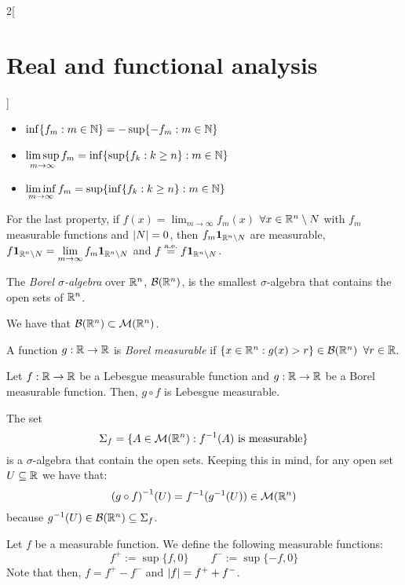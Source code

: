 \documentclass[../../../main_math.tex]{subfiles}
\begin{document}
\begin{multicols}{2}[\section{Real and functional analysis}]
\begin{sproof}
\begin{itemize}
      \item $\displaystyle\inf\{f_m:m\in\mathbb{N}\}=-\sup\{-f_m:m\in\mathbb{N}\}$
      \item $\displaystyle\limsup_{m\to\infty} f_m=\inf\{\sup\{f_k:k\geq n\}:m\in\mathbb{N}\}$
      \item $\displaystyle\liminf_{m\to\infty} f_m =\sup\{\inf\{f_k:k\geq n\}:m\in\mathbb{N}\}$
    \end{itemize}
    For the last property, if $\displaystyle f(x)=\lim_{m\to\infty} f_m(x)$ $\forall x\in\mathbb{R}^n\setminus N$ with $f_m$ measurable functions and $\m{N}=0$, then $f_m\boldsymbol{\mathrm{1}}_{\mathbb{R}^n\setminus N}$ are measurable, $\displaystyle f\boldsymbol{\mathrm{1}}_{\mathbb{R}^n\setminus N}=\lim_{m\to\infty} f_m\boldsymbol{\mathrm{1}}_{\mathbb{R}^n\setminus N}$ and $f\overset{\text{a.e.}}{=}f\boldsymbol{\mathrm{1}}_{\mathbb{R}^n\setminus N}$.
  \end{sproof}
  \begin{definition}
    The \emph{Borel $\sigma$-algebra} over $\mathbb{R}^n$, $\mathcal{B}(\mathbb{R}^n)$, is the smallest $\sigma$-algebra that contains the open sets of $\mathbb{R}^n$.
  \end{definition}
  \begin{lemma}
    We have that $\mathcal{B}(\mathbb{R}^n)\subset \mathcal{M}(\mathbb{R}^n)$.
  \end{lemma}
  \begin{definition}
    A function $g:\mathbb{R}\rightarrow\mathbb{R}$ is \emph{Borel measurable} if $\{x\in\mathbb{R}^n:g(x)> r\}\in \mathcal{B}(\mathbb{R}^n)$ $\forall r\in\mathbb{R}$.
  \end{definition}
  \begin{proposition}
    Let $f:\mathbb{R}\rightarrow\mathbb{R}$ be a Lebesgue measurable function and $g:\mathbb{R}\rightarrow\mathbb{R}$ be a Borel measurable function. Then, $g\circ f$ is Lebesgue measurable.
  \end{proposition}
  \begin{sproof}
    The set
    $$
      \Sigma_f=\{A\in\mathcal{M}(\mathbb{R}^n):f^{-1}(A)\text{ is measurable}\}
    $$
    is a $\sigma$-algebra that contain the open sets. Keeping this in mind, for any open set $U\subseteq\mathbb{R}$ we have that: $${(g\circ f)}^{-1}(U)=f^{-1}(g^{-1}(U))\in\mathcal{M}(\mathbb{R}^n)$$ because $g^{-1}(U)\in\mathcal{B}(\mathbb{R}^n)\subseteq \Sigma_f$.
  \end{sproof}
  \begin{definition}
    Let $f$ be a measurable function. We define the following measurable functions:
    $$f^+:=\sup\{f,0\}\qquad f^-:=\sup\{-f,0\}$$
    Note that then, $f=f^+-f^-$ and $\abs{f}=f^++f^-$.
  \end{definition}
  \begin{definition}

\end{definition}
\end{multicols}
\end{document}

